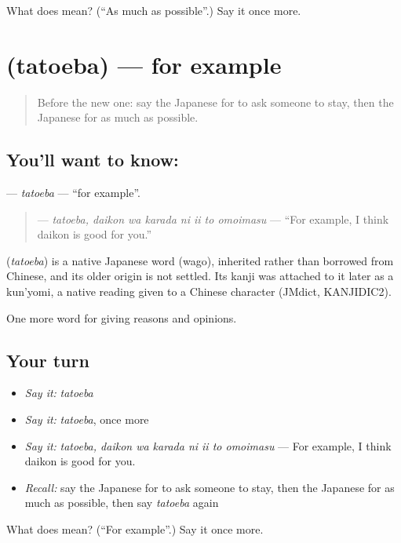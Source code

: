\begin{tcolorbox}[breakable,colback=teal!4,colframe=teal!35!black,title={Before you move on}]
What does  mean? (\textquotedblleft{}As much as possible\textquotedblright{}.) Say it once more.
\end{tcolorbox}
\section[\texorpdfstring{\ja{たとえば} (tatoeba)}{たとえば (tatoeba)}]{ (tatoeba) — for example}

\label{lesson:JA-C341-tatoeba}



\begin{quote}
Before the new one: say the Japanese for to ask someone to stay, then the Japanese for as much as possible.
\end{quote}

\subsection*{You'll want to know: }
\textbf{} — \emph{tatoeba} — \textquotedblleft{}for example\textquotedblright{}.

\begin{quote}
\textbf{   } — \emph{tatoeba, daikon wa karada ni ii to omoimasu} — \textquotedblleft{}For example, I think daikon is good for you.\textquotedblright{}
\end{quote}

\begin{cousinweb}
\textbf{} (\emph{tatoeba}) is a native Japanese word (wago), inherited rather than borrowed from Chinese, and its older origin is not settled. Its kanji was attached to it later as a kun'yomi, a native reading given to a Chinese character (JMdict, KANJIDIC2).
\end{cousinweb}

\begin{grammarlens}[title={What you've built}]
One more word for giving reasons and opinions.
\end{grammarlens}

\subsection*{Your turn}
\begin{itemize}
\raggedright
  \item \emph{Say it:} \emph{tatoeba}
  \item \emph{Say it:} \emph{tatoeba}, once more
  \item \emph{Say it:} \emph{tatoeba, daikon wa karada ni ii to omoimasu} — For example, I think daikon is good for you.
  \item \emph{Recall:} say the Japanese for to ask someone to stay, then the Japanese for as much as possible, then say \emph{tatoeba} again
\end{itemize}

\begin{tcolorbox}[breakable,colback=teal!4,colframe=teal!35!black,title={Before you move on}]
What does  mean? (\textquotedblleft{}For example\textquotedblright{}.) Say it once more.
\end{tcolorbox}
